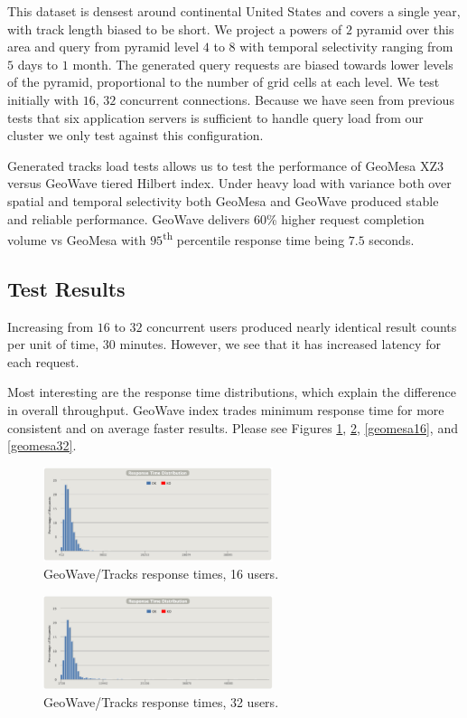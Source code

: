 This dataset is densest around continental United States and covers a single year, with track length biased to be short.
We project a powers of $2$ pyramid over this area and query from pyramid level $4$ to $8$ with temporal selectivity ranging from $5$ days to $1$ month.
The generated query requests are biased towards lower levels of the pyramid, proportional to the number of grid cells at each level.
We test initially with $16$, $32$ concurrent connections.
Because we have seen from previous tests that six application servers is sufficient to handle query load from our cluster we only test against this configuration.

Generated tracks load tests allows us to test the performance of GeoMesa XZ3 versus GeoWave tiered Hilbert index.
Under heavy load with variance both over spatial and temporal selectivity both GeoMesa and GeoWave produced stable and reliable performance.
GeoWave delivers $60$\% higher request completion volume vs GeoMesa with $95$\textsuperscript{th} percentile response time being $7.5$ seconds.

\subsection{Test Results}

Increasing from $16$ to $32$ concurrent users produced nearly identical result counts per unit of time, $30$ minutes.
However, we see that it has increased latency for each request.

Most interesting are the response time distributions, which explain the difference in overall throughput.
GeoWave index trades minimum response time for more consistent and on average faster results.
Please see Figures \ref{geowave16}, \ref{geowave32}, \ref{geomesa16}, and \ref{geomesa32}.

\begin{figure}[h!tb]
  \centering
  \includegraphics[width=0.60\textwidth]{../docs/img/multitenancy/gw-16-responses.png}
  \caption{GeoWave/Tracks response times, 16 users.}
  \label{geowave16}
\end{figure}

\begin{figure}[h!tb]
  \centering
  \includegraphics[width=0.60\textwidth]{../docs/img/multitenancy/gw-32-responses.png}
  \caption{GeoWave/Tracks response times, 32 users.}
  \label{geowave32}
\end{figure}

